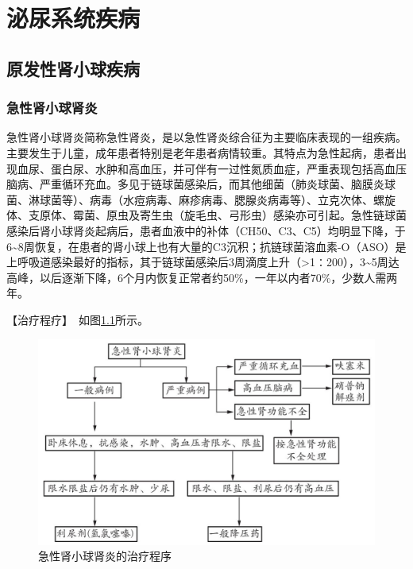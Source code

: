\chapter{泌尿系统疾病}

\section{原发性肾小球疾病}

\subsection{急性肾小球肾炎}

急性肾小球肾炎简称急性肾炎，是以急性肾炎综合征为主要临床表现的一组疾病。主要发生于儿童，成年患者特别是老年患者病情较重。其特点为急性起病，患者出现血尿、蛋白尿、水肿和高血压，并可伴有一过性氮质血症，严重表现包括高血压脑病、严重循环充血。多见于链球菌感染后，而其他细菌（肺炎球菌、脑膜炎球菌、淋球菌等）、病毒（水痘病毒、麻疹病毒、腮腺炎病毒等）、立克次体、螺旋体、支原体、霉菌、原虫及寄生虫（旋毛虫、弓形虫）感染亦可引起。急性链球菌感染后肾小球肾炎起病后，患者血液中的补体（CH50、C3、C5）均明显下降，于6\textasciitilde{}8周恢复，在患者的肾小球上也有大量的C3沉积；抗链球菌溶血素-O（ASO）是上呼吸道感染最好的指标，其于链球菌感染后3周滴度上升（\textgreater{}1∶200），3\textasciitilde{}5周达高峰，以后逐渐下降，6个月内恢复正常者约50\%，一年以内者70\%，少数人需两年。

【治疗程疗】　如图\ref{fig4-1-1}所示。

\begin{figure}[!htbp]
 \centering
 \includegraphics{./images/Image00120.jpg}
 \captionsetup{justification=centering}
 \caption{急性肾小球肾炎的治疗程序}
 \label{fig4-1-1}
  \end{figure} 

